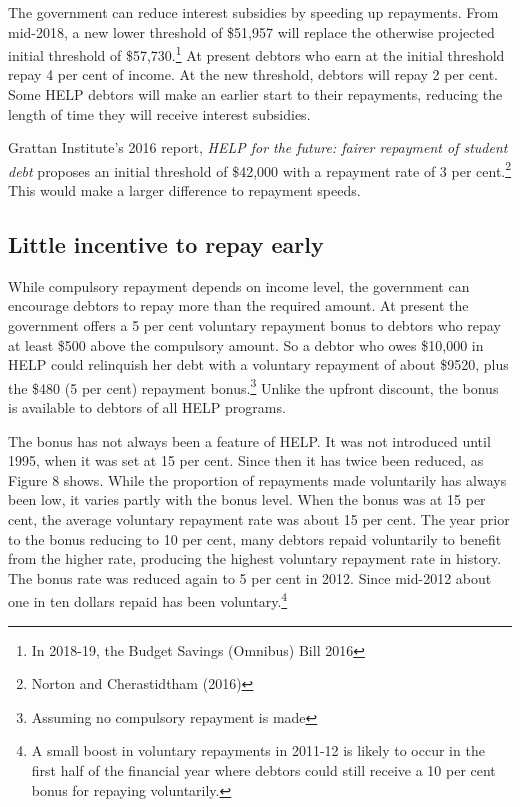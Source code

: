 \documentclass[embargoed]{grattan}
\begin{document}
The government can reduce interest subsidies by speeding up repayments. From mid-2018, a new lower threshold of \$51,957 will replace the otherwise projected initial threshold of \$57,730.\footnote{In 2018-19, the Budget Savings (Omnibus) Bill 2016} At present debtors who earn at the initial threshold repay 4 per cent of income. At the new threshold, debtors will repay 2 per cent. Some HELP debtors will make an earlier start to their repayments, reducing the length of time they will receive interest subsidies.

Grattan Institute's 2016 report, \emph{HELP for the future: fairer repayment of student debt} proposes an initial threshold of \$42,000 with a repayment rate of 3 per cent.\footnote{Norton and Cherastidtham (2016)} This would make a larger difference to repayment speeds.

\subsection{Little incentive to repay early}\label{little-incentive-to-repay-early}

While compulsory repayment depends on income level, the government can encourage debtors to repay more than the required amount. At present the government offers a 5 per cent voluntary repayment bonus to debtors who repay at least \$500 above the compulsory amount. So a debtor who owes \$10,000 in HELP could relinquish her debt with a voluntary repayment of about \$9520, plus the \$480 (5 per cent) repayment bonus.\footnote{Assuming no compulsory repayment is made} Unlike the upfront discount, the bonus is available to debtors of all HELP programs.

The bonus has not always been a feature of HELP. It was not introduced until 1995, when it was set at 15 per cent. Since then it has twice been reduced, as Figure 8 shows. While the proportion of repayments made voluntarily has always been low, it varies partly with the bonus level. When the bonus was at 15 per cent, the average voluntary repayment rate was about 15 per cent. The year prior to the bonus reducing to 10 per cent, many debtors repaid voluntarily to benefit from the higher rate, producing the highest voluntary repayment rate in history. The bonus rate was reduced again to 5 per cent in 2012. Since mid-2012 about one in ten dollars repaid has been voluntary.\footnote{A small boost in voluntary repayments in 2011-12 is likely to occur in the first half of the financial year where debtors could still receive a 10 per cent bonus for repaying voluntarily.}
\end{document}
